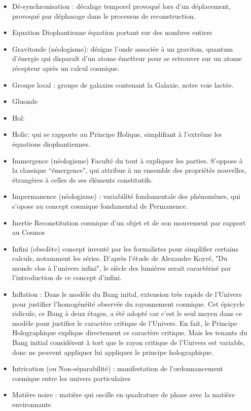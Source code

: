 \documentclass[a4paper,12pt]{article}
\begin{document}
\begin{appendix}
\begin{itemize}
\item Dé-synchronisation : décalage temporel provoqué lors d’un déplacement, provoqué par déphasage dans le processus de reconstruction.
\item Equation Diophantienne équation portant sur des nombres entiers
\item Gravitonde (néologisme): désigne l’onde associée à un graviton, quantum d’énergie qui disparaît d’un atome émetteur pour se retrouver sur un atome récepteur après un calcul cosmique.
\item Groupe local : groupe de galaxies contenant la Galaxie, notre voie lactée.
\item Gluonde
\item Hol: 
\item Holic: qui se rapporte au Principe Holique, simplifiant à l'extr\^eme les équations diophantiennes.
\item Immergence (néologisme) Faculté du tout à expliquer les parties. S’oppose à la classique ``émergence", qui attribue à un ensemble des propriétés nouvelles, étrangères à celles de ses éléments constitutifs.

\item Impermanence (néologisme) : variabilité fondamentale des phénomènes, qui s'opose au concept cosmique fondamental de Permanence.



\item Inertie Reconstitution cosmique d’un objet et de son mouvement par rapport au Cosmos
\item Infini (obsolète) concept inventé par les formalistes pour simplifier certains calculs, notamment les séries. D'après l'étude de Alexandre Koyré, "Du monde clos à l'univers infini", le siècle des lumières serait caractérisé par l'introduction de ce concept d'infini.

\item Inflation : Dans le modèle du Bang inital, extension très rapide de l'Univers pour justifier l'homogénéité observée du rayonnement cosmique.  Cet épicycle ridicule, ce Bang à deux étages, a été adopté car c'est le seul moyen dans ce modèle pour justifier le caractère critique de l'Univers. En fait, le Principe Holographique explique directement ce caractère critique. Mais les tenants du Bang initial considérent à tort que le rayon critique de l'Univers est variable, donc ne peuvent appliquer lui appliquer le principe holographique.



\item Intrication (ou Non-séparabilité) : manifestation de l’ordonnancement cosmique entre les univers particulaires
\item Matière noire : matière qui oscille en quadrature de phase avec la matière environnante



\end{itemize}
\end{appendix}
\end{document}
